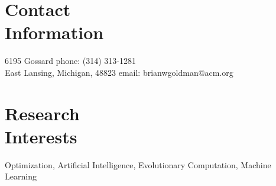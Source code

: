 \documentclass[margin,line]{resume}
\begin{document}
\begin{resume}

    \section{\mysidestyle Contact\\Information}

    6195 Gossard                            \hfill phone: (314) 313-1281          \vspace{0mm}\\\vspace{0mm}%
    East Lansing, Michigan, 48823                          \hfill email: brianwgoldman@acm.org          %
    \section{\mysidestyle Research\\Interests}
    Optimization, Artificial Intelligence, Evolutionary Computation, Machine Learning


\end{resume}
\end{document}
